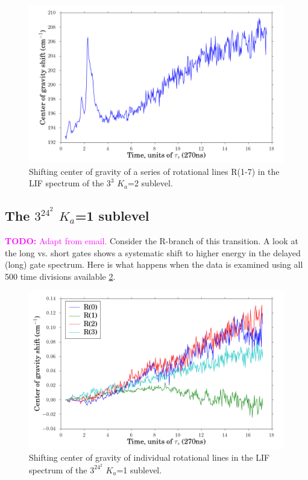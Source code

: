 \documentclass[12pt,draft]{mitthesis}
\newcommand{\TODO} [1]{\textcolor{magenta}{\textbf{TODO:} #1}}
\begin{document}
\begin{figure}
  \caption{Shifting center of gravity of a series of rotational lines
    R(1-7) in the LIF spectrum of the $3^3$ $K_a$=2 sublevel.}
  \label{fig:33k2-cog-delay}
  \centering
  \includegraphics[width=6in]{33k2-cog-delay.png}
\end{figure}

\subsection{The $3^24^2$ $K_a$=1 sublevel}

\TODO{Adapt from email.}  Consider the R-branch of this transition.  A
look at the long vs. short gates shows a systematic shift to higher
energy in the delayed (long) gate spectrum.  Here is what happens when
the data is examined using all 500 time divisions available
\ref{fig:32b2-cog-delay}.

\begin{figure}
  \caption{Shifting center of gravity of individual rotational
    lines in the LIF spectrum of the $3^24^2$ $K_a$=1 sublevel.}
  \label{fig:32b2-cog-delay}
  \centering
  \includegraphics[width=6in]{32b2-cog-delay.png}
\end{figure}
\end{document}
